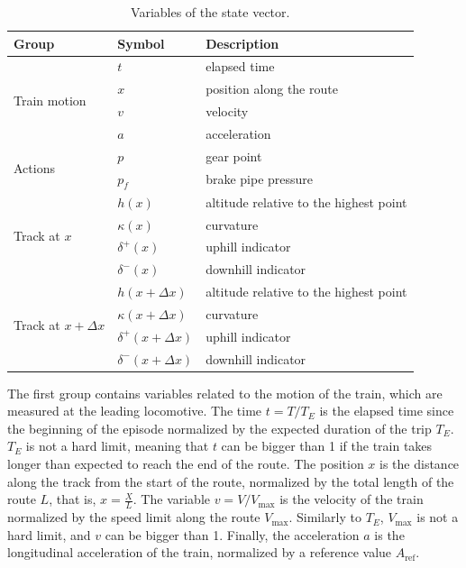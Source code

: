 \documentclass[preprint,10pt]{elsarticle}
\begin{document}
\begin{table}[htbp]
    \centering
    \begin{tabular}{lll}
        \toprule
        Group & Symbol & Description \\
        \midrule
        \multirow{4}{*}{Train motion}
        & $t$ & elapsed time \\
        & $x$ & position along the route \\
        & $v$ & velocity \\
        & $a$ & acceleration \\
        \midrule
        \multirow{2}{*}{Actions}
        & $p$   & gear point \\
        & $p_f$ & brake pipe pressure \\
        \midrule
        \multirow{4}{*}{Track at $x$}
        & $h(x)$          & altitude relative to the highest point \\
        & $\kappa(x)$     & curvature \\
        & $\delta^{+}(x)$ & uphill indicator \\
        & $\delta^{-}(x)$ & downhill indicator \\
        \midrule
        \multirow{4}{*}{Track at $x + \Delta x$}
        & $h(x + \Delta x)$          & altitude relative to the highest point \\
        & $\kappa(x + \Delta x)$     & curvature \\
        & $\delta^{+}(x + \Delta x)$ & uphill indicator \\
        & $\delta^{-}(x + \Delta x)$ & downhill indicator \\
        \bottomrule
    \end{tabular}
    \caption{Variables of the state vector.}
    \label{tab:state}
\end{table}

The first group contains variables related to the motion of the train, which are measured at the leading locomotive. The time $t = T/T_{E}$ is the elapsed time since the beginning of the episode normalized by the expected duration of the trip $T_{E}$. $T_{E}$ is not a hard limit, meaning that $t$ can be bigger than 1 if the train takes longer than expected to reach the end of the route. The position $x$ is the distance along the track from the start of the route, normalized by the total length of the route $L$, that is, $x = \frac{X}{L}$. The variable $v= V/V_{\max}$ is the velocity of the train normalized by the speed limit along the route $V_{\max}$. Similarly to $T_{E}$, $V_{\max}$ is not a hard limit, and $v$ can be bigger than 1. Finally, the acceleration $a$ is the longitudinal acceleration of the train, normalized by a reference value $A_{\text{ref}}$. 
\end{document}
